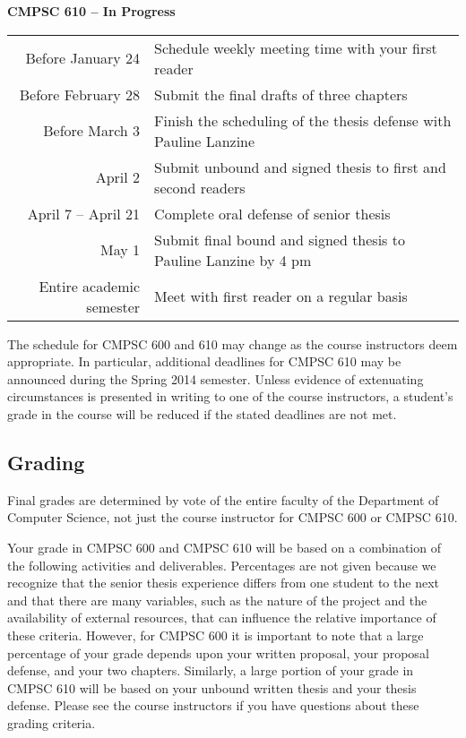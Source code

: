 \vspace*{-.1in}
\noindent
{\bf CMPSC 610 -- In Progress}
\begin{center}
\begin{tabular}{r|l}
\hline
Before January 24 & Schedule weekly meeting time with your first reader \\ 
Before February 28 & Submit the final drafts of three chapters \\
Before March 3 & Finish the scheduling of the thesis defense with Pauline Lanzine \\
April 2 & Submit unbound and signed thesis to first and second readers \\
April 7 -- April 21 & Complete oral defense of senior thesis \\
May 1 & Submit final bound and signed thesis to Pauline Lanzine by 4 pm\\
\hline
Entire academic semester & Meet with first reader on a regular basis \\ 
\hline
\end{tabular}
\end{center}

\noindent The schedule for CMPSC 600 and 610 may change as the course instructors deem appropriate. In particular,
additional deadlines for CMPSC 610 may be announced during the Spring 2014 semester. Unless evidence of extenuating
circumstances is presented in writing to one of the course instructors, a student's grade in the course will be reduced
if the stated deadlines are not met.

\vspace*{-.15in}
\subsection*{Grading}
\vspace*{-.05in}

Final grades are determined by vote of the entire faculty of the Department of Computer Science, not just the course
instructor for CMPSC 600 or CMPSC 610.

Your grade in CMPSC 600 and CMPSC 610 will be based on a combination of the following activities and deliverables.
Percentages are not given because we recognize that the senior thesis experience differs from one student to the next
and that there are many variables, such as the nature of the project and the availability of external resources, that
can influence the relative importance of these criteria. However, for CMPSC 600 it is important to note that a large
percentage of your grade depends upon your written proposal, your proposal defense, and your two chapters. Similarly, a
large portion of your grade in CMPSC 610 will be based on your unbound written thesis and your thesis defense. Please
see the course instructors if you have questions about these grading criteria.

